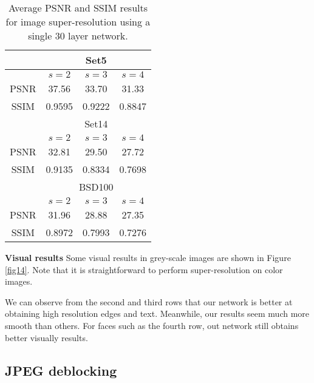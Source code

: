 \begin{table}[htb!]
\centering
%
\caption{Average PSNR and SSIM results for image super-resolution using a single 30 layer network.}
\begin{tabular}{c|c c c } \hline
       &\multicolumn{3}{c}{Set5}     \\ \hline
       &$s = 2$  &$s = 3$  &$s = 4$  \\ \hline
  PSNR &37.56    &33.70    &31.33    \\ \hline
  SSIM &0.9595   &0.9222   &0.8847   \\ \hline
       &\multicolumn{3}{c}{Set14}    \\ \hline
       &$s = 2$  &$s = 3$  &$s = 4$  \\ \hline
  PSNR &32.81    &29.50    &27.72    \\ \hline
  SSIM &0.9135   &0.8334   &0.7698   \\ \hline
       &\multicolumn{3}{c}{BSD100}   \\ \hline
       &$s = 2$  &$s = 3$  &$s = 4$  \\ \hline
  PSNR &31.96    &28.88    &27.35    \\ \hline
  SSIM &0.8972   &0.7993   &0.7276   \\ \hline
\end{tabular}
\label{table8}
\end{table}


{\bf{Visual results}} Some visual results in grey-scale images are shown in Figure \ref{fig14}.
Note that it is straightforward to perform super-resolution on color images.

We can observe from
the second and third rows that our network is better at obtaining high resolution edges
and text. Meanwhile, our results seem much more smooth than others. For faces such as
the fourth row, out network still obtains better visually results.

\begin{figure*}
\centering
\subfigure{\texttt{[image: 3-1]} }
\subfigure{\texttt{[image: 3-2]} }
\subfigure{\texttt{[image: 3-3]} }
\subfigure{\texttt{[image: 3-4]} }
\caption{Visual results of image super-resolution.
Images from left to right column are: High resolution image;
the recovered image of RED30, ARFL+, CSC, CSCN, NBSRF, SRCNN, TSE.}
\label{fig14}
\end{figure*}




\subsection{JPEG deblocking}

